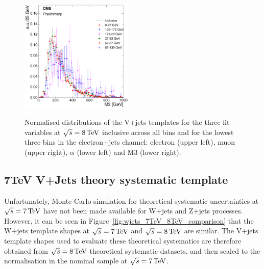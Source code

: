 \begin{figure}[hbtp]
     \includegraphics[width=0.48\textwidth]{Chapters/04_Analysis/04b_XSections/images/8TeV/fit_variables/electron/MET/M3/vjets/MET_M3_2orMoreBtags_VJets_template_comparison.pdf}\\
	 \caption{Normalised distributions of the V+jets templates for the three fit variables at $\sqrt{s}=8\,\text{Te\hspace{-.08em}V}$
	 inclusive across all \met bins and for the lowest three \met bins in the electron+jets channel: electron
	 \abseta (upper left), muon \abseta (upper right), $\alpha$ (lower left) and M3 (lower right).}
     \label{fig:MET_fit_variable_vjets_comparisons_8TeV}
\end{figure}
\FloatBarrier

\subsection{7TeV V+Jets theory systematic template}
\label{ss:7TeV_vjets_theory_systematic_template}
Unfortunately, Monte Carlo simulation for theoretical systematic uncertainties at $\sqrt{s}=7\,\text{Te\hspace{-.08em}V}$ have not
been made available for W+jets and Z+jets processes. However, it can be seen in
Figure~\ref{fig:wjets_7TeV_8TeV_comparison} that the W+jets template shapes at $\sqrt{s}=7\,\text{Te\hspace{-.08em}V}$ and
$\sqrt{s}=8\,\text{Te\hspace{-.08em}V}$ are similar. The V+jets template shapes used to evaluate these theoretical systematics are
therefore obtained from $\sqrt{s}=8\,\text{Te\hspace{-.08em}V}$ theoretical systematic datasets, and then scaled to the normalisation
in the nominal sample at $\sqrt{s}=7\,\text{Te\hspace{-.08em}V}$.

